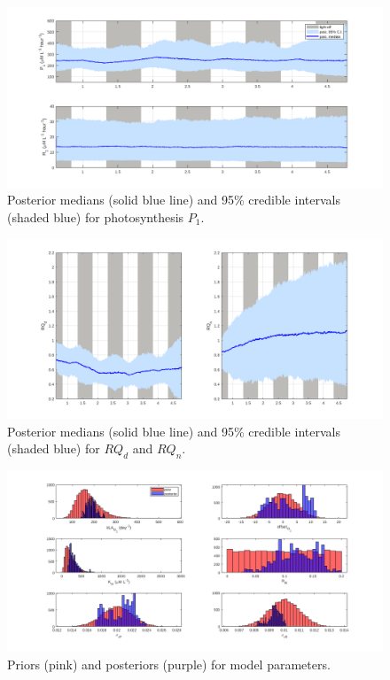 \documentclass{ruthesis}
\begin{document}
\begin{figure}
	\centerline{\includegraphics[width=1.2\textwidth]{images_microalgae/plots_chris_offset_thinned/P_and_R}}
	\caption[.]{Posterior medians (solid blue line) and 95\% credible intervals (shaded blue) for photosynthesis $P_1$.}
	\label{fig:micro_exp_test_P}
\end{figure}

\begin{figure}
	\centerline{\includegraphics[width=1.2\textwidth]{images_microalgae/plots_chris_offset_thinned/RQ_d_RQ_n}}
	\caption[.]{Posterior medians (solid blue line) and 95\% credible intervals (shaded blue) for $RQ_d$ and $RQ_n$.}
	\label{fig:micro_exp_test_RQ_d_RQ_n}
\end{figure}

\begin{figure}
	\centerline{\includegraphics[width=1.3\textwidth]{images_microalgae/plots_chris_offset_thinned/modelparameters1}}
	\caption[.]{Priors (pink) and posteriors (purple) for model parameters.}
	\label{fig:micro_exp_test_parameters_model1}
\end{figure}
\end{document}
